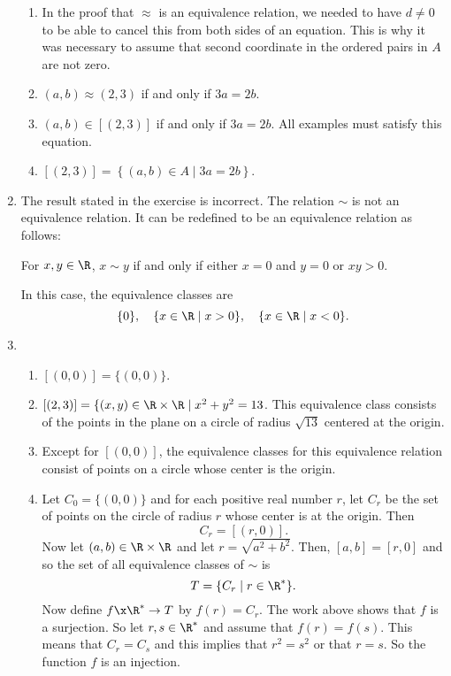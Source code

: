 \begin{enumerate}
\begin{enumerate}
\item In the proof that $\approx$ is an equivalence relation, we needed to have $d \ne 0$ to be able to cancel this from both sides of an equation.  This is why it was necessary to assume that second coordinate in the ordered pairs in $A$ are not zero.

\item $\left( a, b \right) \approx \left( 2, 3 \right)$ if and only if  $3a = 2b$.


\item $\left( a, b \right) \in \left[ \left( 2, 3 \right) \right]$ if and only if $3a = 2b$.  All examples must satisfy this equation.

\item $\left[ \left( 2, 3 \right) \right] = \left\{ \left( a, b \right) \in A \mid 3a = 2b \right\}$.
\end{enumerate}



\item The result stated in the exercise is incorrect.  The relation $\sim$ is not an equivalence relation.  It can be redefined to be an equivalence relation as follows:
\begin{center}
For $x, y \in \R$, $x \sim y$ if and only if either $x = 0$ and $y = 0$ or $xy > 0$.
\end{center}
In this case, the equivalence classes are
\[
\{ 0 \}, \quad \{ x \in \R \mid x > 0 \}, \quad \{ x \in \R \mid x < 0 \}.
\]



\item \begin{enumerate}
\item $[ (0, 0) ] = \{ (0, 0) \}$.

\item $[ (2, 3) ] = \{ (x, y) \in \R \times \R \mid x^2 + y^2 = 13$.  This equivalence class consists of the points in the plane on a circle of radius $\sqrt{13}$ centered at the origin.

\item Except for $[(0, 0)]$, the equivalence classes for this equivalence relation consist of points on a circle whose center is the origin.

\item Let $C_0 = \{ (0, 0) \}$ and for each positive real number $r$, let $C_r$ be the set of points on the circle of radius $r$ whose center is at the origin.  Then
\[
C_r = [ (r, 0) ].
\]
Now let $(a, b) \in \R \times \R$ and let $r = \sqrt{a^2 + b^2}$.  Then, $[a, b] = [r, 0]$ and so the set of all equivalence classes of $\sim$ is 
\[
T =  \{ C_r \mid r \in \R^* \}.
\]
Now define $f\x \R^* \to T$ by $f(r) = C_r$.  The work above shows that $f$ is a surjection.  So let $r, s \in \R^*$ and assume that $f(r) = f(s)$.  This means that 
$C_r = C_s$ and this implies that $r^2 = s^2$ or that $r = s$.  So the function $f$ is an injection.
\end{enumerate}






\end{enumerate}
